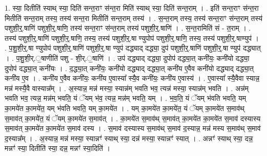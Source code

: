 \documentclass[17pt]{extarticle}
\begin{document}
1. स्या॒ दितीति॑ स्याथ् स्या॒ दिति॑ सन्त॒राꣳ स॑न्त॒रा मिति॑ स्याथ् स्या॒ दिति॑ सन्त॒राम् । . इति॑ सन्त॒राꣳ स॑न्त॒रा मितीति॑ सन्त॒राम् तस्य॒ तस्य॑ सन्त॒रा मितीति॑ सन्त॒राम् तस्य॑ । . स॒न्त॒राम् तस्य॒ तस्य॑ सन्त॒राꣳ स॑न्त॒राम् तस्य॑ पशुशी॒र्॒.षाणि॑ पशुशी॒र्॒.षाणि॒ तस्य॑ सन्त॒राꣳ स॑न्त॒राम् तस्य॑ पशुशी॒र्॒.षाणि॑ । . स॒न्त॒रामिति॑ सं - त॒राम् । . तस्य॑ पशुशी॒र्॒.षाणि॑ पशुशी॒र्॒.षाणि॒ तस्य॒ तस्य॑ पशुशी॒र्॒.षा ण्युपोप॑ पशुशी॒र्॒.षाणि॒ तस्य॒ तस्य॑ पशुशी॒र्॒.षाण्युप॑ । . प॒शु॒शी॒र्॒.षा ण्युपोप॑ पशुशी॒र्॒.षाणि॑ पशुशी॒र्॒.षा ण्युप॑ दद्ध्याद् दद्ध्या॒ दुप॑ पशुशी॒र्॒.षाणि॑ पशुशी॒र्॒.षा ण्युप॑ दद्ध्यात् । . प॒शु॒शी॒र्.॒षाणीति॑ पशु - शी॒र्.॒षाणि॑ । . उप॑ दद्ध्याद् दद्ध्या॒ दुपोप॑ दद्ध्या॒त् कनी॑यः॒ कनी॑यो दद्ध्या॒ दुपोप॑ दद्ध्या॒त् कनी॑यः । . द॒द्ध्या॒त् कनी॑यः॒ कनी॑यो दद्ध्याद् दद्ध्या॒त् कनी॑य ए॒वैव कनी॑यो दद्ध्याद् दद्ध्या॒त् कनी॑य ए॒व । . कनी॑य ए॒वैव कनी॑यः॒ कनी॑य ए॒वास्या᳚ स्यै॒व कनी॑यः॒ कनी॑य ए॒वास्य॑ । . ए॒वास्या᳚ स्यै॒वैवा स्यान्न॒ मन्न॑ मस्यै॒वै वास्यान्न᳚म् । . अ॒स्यान्न॒ मन्न॑ मस्या॒ स्यान्न॑म् भवति भव॒ त्यन्न॑ मस्या॒ स्यान्न॑म् भवति । . अन्न॑म् भवति भव॒ त्यन्न॒ मन्न॑म् भवति॒ यं ॅयम् भ॑व॒ त्यन्न॒ मन्न॑म् भवति॒ यम् । . भ॒व॒ति॒ यं ॅयम् भ॑वति भवति॒ यम् का॒मये॑त का॒मये॑त॒ यम् भ॑वति भवति॒ यम् का॒मये॑त । . यम् का॒मये॑त का॒मये॑त॒ यं ॅयम् का॒मये॑त स॒माव॑थ् स॒माव॑त् का॒मये॑त॒ यं ॅयम् का॒मये॑त स॒माव॑त् । . का॒मये॑त स॒माव॑थ् स॒माव॑त् का॒मये॑त का॒मये॑त स॒माव॑ दस्यास्य स॒माव॑त् का॒मये॑त का॒मये॑त स॒माव॑ दस्य । . स॒माव॑ दस्यास्य स॒माव॑थ् स॒माव॑ द॒स्यान्न॒ मन्न॑ मस्य स॒माव॑थ् स॒माव॑ द॒स्यान्न᳚म् । . अ॒स्यान्न॒ मन्न॑ मस्या॒ स्यान्नꣳ॑ स्याथ् स्या॒ दन्न॑ मस्या॒ स्यान्नꣳ॑ स्यात् । . अन्नꣳ॑ स्याथ् स्या॒ दन्न॒ मन्नꣳ॑ स्या॒ दितीति॑ स्या॒ दन्न॒ मन्नꣳ॑ स्या॒दिति॑ । \newline
\end{document}
